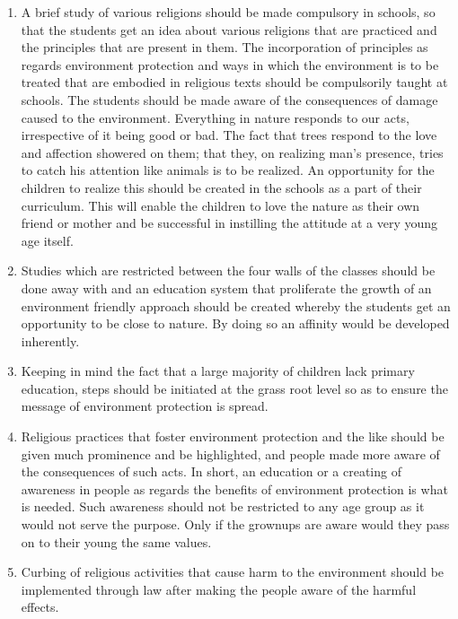 \begin{multicols}{2}
\vspace{-.3cm}

\begin{enumerate}[label=$\bullet$]
\item A brief study of various religions should be made compulsory in schools, so that the
students get an idea about various religions that are practiced and the principles that are
present in them. The incorporation of principles as regards environment protection and
ways in which the environment is to be treated that are embodied in religious texts
should be compulsorily taught at schools. The students should be made aware of the
consequences of damage caused to the environment. Everything in nature responds to
our acts, irrespective of it being good or bad. The fact that trees respond to the love and
affection showered on them; that they, on realizing man’s presence, tries to catch his
attention like animals is to be realized. An opportunity for the children to realize this
should be created in the schools as a part of their curriculum. This will enable the
children to love the nature as their own friend or mother and be successful in instilling
the attitude at a very young age itself.

\item Studies which are restricted between the four walls of the classes should be done away
with and an education system that proliferate the growth of an environment friendly
approach should be created whereby the students get an opportunity to be close to
nature. By doing so an affinity would be developed inherently.

\item Keeping in mind the fact that a large majority of children lack primary education, steps
should be initiated at the grass root level so as to ensure the message of environment
protection is spread.

\item Religious practices that foster environment protection and the like should be given
much prominence and be highlighted, and people made more aware of the
consequences of such acts. In short, an education or a creating of awareness in people
as regards the benefits of environment protection is what is needed. Such awareness
should not be restricted to any age group as it would not serve the purpose. Only if the
grownups are aware would they pass on to their young the same values.

\item Curbing of religious activities that cause harm to the environment should be implemented through law after making the people aware of the harmful effects.


\end{enumerate}
\end{multicols}
